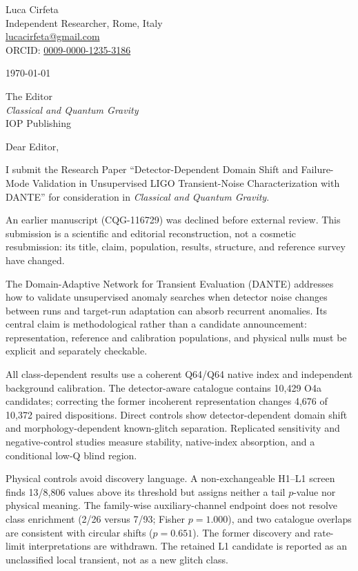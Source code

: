 \documentclass[10pt,a4paper]{article}
\begin{document}
\noindent
{\large Luca Cirfeta}\\
Independent Researcher, Rome, Italy\\
\href{mailto:lucacirfeta@gmail.com}{lucacirfeta@gmail.com}\\
ORCID: \href{https://orcid.org/0009-0000-1235-3186}{0009-0000-1235-3186}

\vspace{0.7em}
\noindent
\today

\vspace{0.7em}
\noindent
The Editor\\
\emph{Classical and Quantum Gravity}\\
IOP Publishing

\vspace{0.9em}
\noindent Dear Editor,

I submit the Research Paper ``Detector-Dependent Domain Shift and Failure-Mode
Validation in Unsupervised LIGO Transient-Noise Characterization with DANTE''
for consideration in \emph{Classical and Quantum Gravity}.

An earlier manuscript (CQG-116729) was declined before external review.  This
submission is a scientific and editorial reconstruction, not a cosmetic
resubmission: its title, claim, population, results, structure, and reference
survey have changed.

The Domain-Adaptive Network for Transient Evaluation (DANTE) addresses how to
validate unsupervised anomaly searches when detector noise changes between runs
and target-run adaptation can absorb recurrent anomalies. Its central claim is
methodological rather than a candidate announcement: representation, reference
and calibration populations, and physical nulls must be explicit and separately
checkable.

All class-dependent results use a coherent Q64/Q64 native index and independent
background calibration.  The detector-aware catalogue contains 10,429 O4a
candidates; correcting the former incoherent representation changes 4,676 of
10,372 paired dispositions.  Direct controls show detector-dependent domain
shift and morphology-dependent known-glitch separation.  Replicated
sensitivity and negative-control studies measure stability, native-index
absorption, and a conditional low-Q blind region.

Physical controls avoid discovery language. A non-exchangeable H1--L1 screen
finds 13/8,806 values above its threshold but assigns neither a tail $p$-value
nor physical meaning. The family-wise auxiliary-channel endpoint does not
resolve class enrichment (2/26 versus 7/93; Fisher $p=1.000$), and two catalogue
overlaps are consistent with circular shifts ($p=0.651$). The former discovery
and rate-limit interpretations are withdrawn. The retained L1 candidate is
reported as an unclassified local transient, not as a new glitch class.
\end{document}
